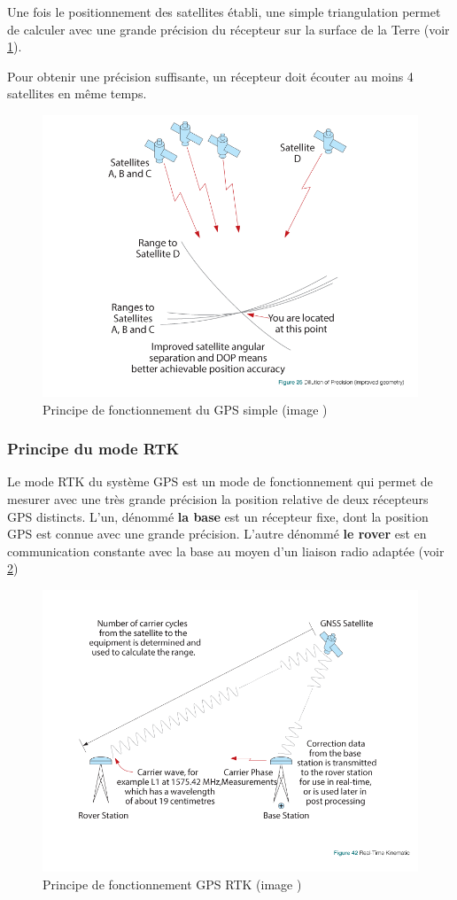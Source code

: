 \documentclass[12pt,a4paper]{report}
\begin{document}
		\para Une fois le positionnement des satellites établi, une simple triangulation permet de calculer avec une grande précision du récepteur sur la surface de la Terre (voir \ref{fig:gnss}).
		
		\para Pour obtenir une précision suffisante, un récepteur doit écouter au moins 4 satellites en même temps.
		
		\begin{figure}[h!]
			\centering
			\includegraphics[width=0.7\linewidth]{img/gnss}
			\caption[gpssimple]{Principe de fonctionnement du GPS simple (image \cite{jeffrey_introduction_2010})}
			\label{fig:gnss}
		\end{figure}
		
		\subsubsection{Principe du mode RTK}
		Le mode RTK du système GPS est un mode de fonctionnement qui permet de mesurer avec une très grande précision la position relative de deux récepteurs GPS distincts. L'un, dénommé \textbf{la base} est un récepteur fixe, dont la position GPS est connue avec une grande précision. L'autre dénommé \textbf{le rover} est en communication constante avec la base au moyen d'un liaison radio adaptée (voir \ref{fig:rtk})
		
		\begin{figure}[h!]
			\centering
			\includegraphics[width=0.7\linewidth]{img/rtk}
			\caption[gpsrtk]{Principe de fonctionnement GPS RTK (image \cite{jeffrey_introduction_2010}) }
			\label{fig:rtk}
		\end{figure}
	
\end{document}
